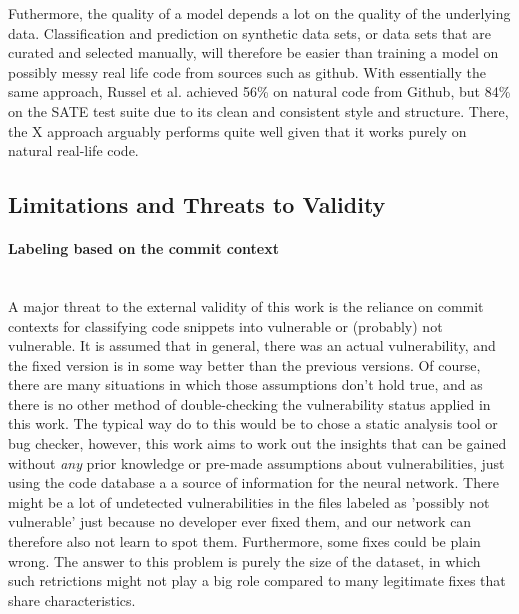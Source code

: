 \documentclass[
	a4paper,
	pagesize,
	pdftex,
	12pt,
	twoside, %
	BCOR=5mm, %
	ngerman,
	fleqn,
	final,
	]{scrartcl}
\begin{document}
Futhermore, the quality of a model depends a lot on the quality of the underlying data. Classification and prediction on synthetic data sets, or data sets that are curated and selected manually, will therefore be easier than training a model on possibly messy real life code from sources such as github. With essentially the same approach, Russel et al. achieved 56\% on natural code from Github, but 84\% on the SATE test suite due to its clean and consistent style and structure. There, the X approach arguably performs quite well given that it works purely on natural real-life code. 







\subsection{Limitations and Threats to Validity}

\paragraph{Labeling based on the commit context}\mbox{}\\
A major threat to the external validity of this work is the reliance on commit contexts for classifying code snippets into vulnerable or (probably) not vulnerable. It is assumed that in general, there was an actual vulnerability, and the fixed version is in some way better than the previous versions. Of course, there are many situations in which those assumptions don't hold true, and as there is no other method of double-checking the vulnerability status applied in this work. The typical way do to this would be to chose a static analysis tool or bug checker, however, this work aims to work out the insights that can be gained without \textit{any} prior knowledge or pre-made assumptions about vulnerabilities, just using the code database a a source of information for the neural network. There might be a lot of undetected vulnerabilities in the files labeled as 'possibly not vulnerable' just because no developer ever fixed them, and our network can therefore also not learn to spot them. Furthermore, some fixes could be plain wrong. The answer to this problem is purely the size of the dataset, in which such retrictions might not play a big role compared to many legitimate fixes that share characteristics.
\end{document}
